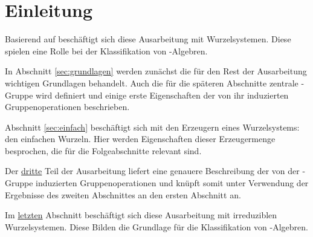 \section*{Einleitung}

Basierend auf \cite[S.49-55]{humphreys1972introduction} beschäftigt sich diese Ausarbeitung mit Wurzelsystemen.
Diese spielen eine Rolle bei der Klassifikation von \lie\hyp{}Algebren.

In Abschnitt \ref{sec:grundlagen} werden zunächst die für den Rest der Ausarbeitung wichtigen Grundlagen behandelt.
Auch die für die späteren Abschnitte zentrale \weyl\hyp{}Gruppe wird definiert und einige erste Eigenschaften der von ihr induzierten Gruppenoperationen beschrieben.

Abschnitt \ref{sec:einfach} beschäftigt sich mit den Erzeugern eines Wurzelsystems: den einfachen Wurzeln. 
Hier werden Eigenschaften dieser Erzeugermenge besprochen, die für die Folgeabschnitte relevant sind.

Der \hyperref[sec:weylgroup]{dritte} Teil der Ausarbeitung liefert eine genauere Beschreibung der von der \weyl\hyp{}Gruppe induzierten Gruppenoperationen und knüpft somit unter Verwendung der Ergebnisse des zweiten Abschnittes an den ersten Abschnitt an.

Im \hyperref[sec:irreduc]{letzten} Abschnitt beschäftigt sich diese Ausarbeitung mit irreduziblen Wurzelsystemen. 
Diese Bilden die Grundlage für die Klassifikation von \lie\hyp{}Algebren.
